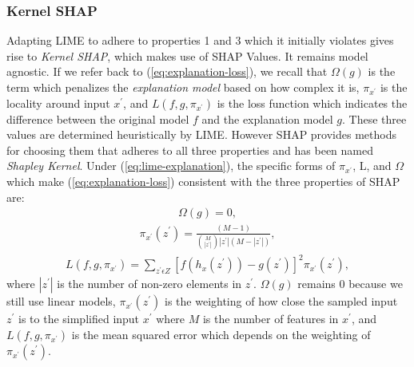 \subsubsection{Kernel SHAP}
Adapting LIME to adhere to properties 1 and 3 which it initially violates gives rise to \emph{Kernel SHAP}, which makes use of SHAP Values. It remains model agnostic. If we refer back to (\ref{eq:explanation-loss}), we recall that $\Omega(g)$ is the term which penalizes the \emph{explanation model} based on how complex it is, $\pi_{x^{'}}$ is the locality around input $x^{'}$, and $L(f, g, \pi_{x^{'}})$ is the loss function which indicates the difference between the original model $f$ and the explanation model $g$. These three values are determined heuristically by LIME. However SHAP \cite{NIPS2017_7062} provides methods for choosing them that adheres to all three properties and has been named \emph{Shapley Kernel}.
Under (\ref{eq:lime-explanation}), the specific forms of $\pi_{x^{'}}$, L, and $\Omega$ which make (\ref{eq:explanation-loss}) consistent with the three properties of SHAP are:
\begin{align*}
   \Omega(g) = 0,
\end{align*}
\begin{align*}
    \pi_{x^{'}}(z^{'}) = \frac{(M-1)}{{M \choose |z^{'}|}|z^{'}|(M-|z^{'}|)},
\end{align*}
\begin{align*}
    L(f,g,\pi_{x^{'}}) = \sum\limits_{z^{'}\epsilon Z} [f(h_{x}(z^{'})) - g(z^{'})]^{2} \pi_{x^{'}}(z^{'}),
\end{align*}
where $|z^{'}|$ is the number of non-zero elements in $z^{'}$. $\Omega(g)$ remains 0 because we still use linear models, $\pi_{x^{'}}(z^{'})$ is the weighting of how close the sampled input $z^{'}$ is to the simplified input $x^{'}$  where $M$ is the number of features in $x^{'}$, and $L(f,g,\pi_{x^{'}})$ is the mean squared error which depends on the weighting of $\pi_{x^{'}}(z^{'})$. 


